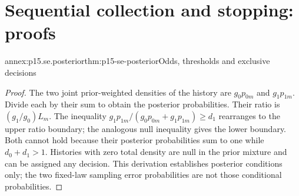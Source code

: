\section{Sequential collection and stopping: proofs}
\label{sec:annex-p15-sequential-evidence}

\begin{annexitem}{annex:p15.se.posterior}{thm:p15-se-posterior}{Odds, thresholds and exclusive decisions}
\begin{proof}
The two joint prior-weighted densities of the history are
\(g_0p_{0m}\) and \(g_1p_{1m}\). Divide each by their sum to
obtain the posterior probabilities. Their ratio is
\((g_1/g_0)L_m\). The inequality
\(g_1p_{1m}/(g_0p_{0m}+g_1p_{1m})\geq d_1\) rearranges to
the upper ratio boundary; the analogous null inequality gives the
lower boundary. Both cannot hold because their posterior probabilities
sum to one while \(d_0+d_1>1\). Histories with zero total density
are null in the prior mixture and can be assigned any decision.
This derivation establishes posterior conditions only; the two fixed-law
sampling error probabilities are not those conditional probabilities.
\end{proof}
\end{annexitem}

